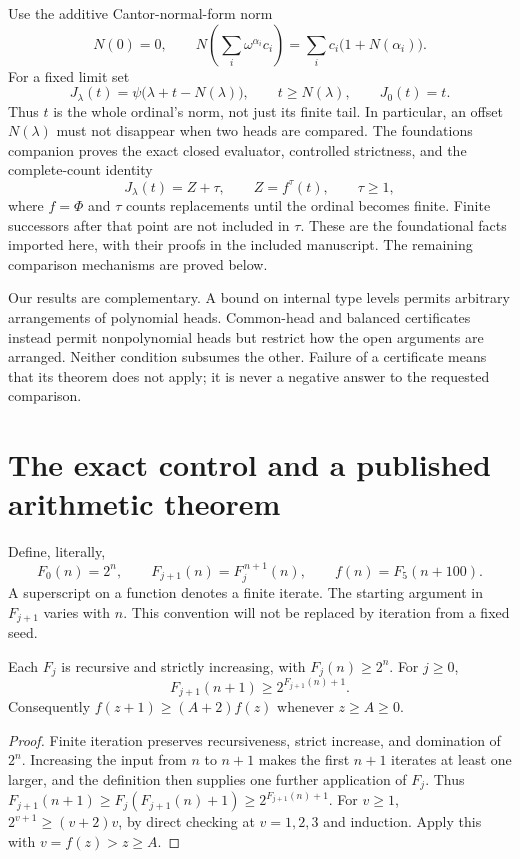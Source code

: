 \documentclass[11pt]{article}
\begin{document}
Use the additive Cantor-normal-form norm
\[
 N(0)=0,\qquad
 N\!\left(\sum_i\omega^{\alpha_i}c_i\right)
       =\sum_i c_i\bigl(1+N(\alpha_i)\bigr).
\]
For a fixed limit set
\begin{equation}\label{eq:J}
 J_\lambda(t)=\psi\bigl(\lambda+t-N(\lambda)\bigr),
       \qquad t\ge N(\lambda),\qquad J_0(t)=t.
\end{equation}
Thus $t$ is the whole ordinal's norm, not just its finite tail. In particular,
an offset $N(\lambda)$ must not disappear when two heads are compared.
The foundations companion proves the exact closed evaluator, controlled
strictness, and the complete-count identity
\begin{equation}\label{eq:complete}
 J_\lambda(t)=Z+\tau,\qquad Z=f^\tau(t),\qquad \tau\ge1,
\end{equation}
where $f=\Phi$ and $\tau$ counts replacements until the ordinal becomes
finite. Finite successors after that point are not included in $\tau$.
These are the foundational facts imported here, with their proofs in the
included manuscript. The remaining comparison mechanisms are proved below.

Our results are complementary. A bound on internal type levels permits
arbitrary arrangements of polynomial heads. Common-head and balanced
certificates instead permit nonpolynomial heads but restrict how the open
arguments are arranged. Neither condition subsumes the other. Failure of a
certificate means that its theorem does not apply; it is never a negative
answer to the requested comparison.

\section{The exact control and a published arithmetic theorem}
Define, literally,
\begin{equation}\label{eq:f}
 F_0(n)=2^n,\qquad F_{j+1}(n)=F_j^{\,n+1}(n),\qquad
 f(n)=F_5(n+100).
\end{equation}
A superscript on a function denotes a finite iterate. The starting argument
in $F_{j+1}$ varies with $n$. This convention will not be replaced by
iteration from a fixed seed.

\begin{lemma}[Growth]\label{lem:growth}
Each $F_j$ is recursive and strictly increasing, with $F_j(n)\ge2^n$.
For $j\ge0$,
\[
 F_{j+1}(n+1)\ge2^{F_{j+1}(n)+1}.
\]
Consequently $f(z+1)\ge(A+2)f(z)$ whenever $z\ge A\ge0$.
\end{lemma}
\begin{proof}
Finite iteration preserves recursiveness, strict increase, and domination
of $2^n$. Increasing the input from $n$ to $n+1$ makes the first $n+1$
iterates at least one larger, and the definition then supplies one further
application of $F_j$. Thus
$F_{j+1}(n+1)\ge F_j(F_{j+1}(n)+1)\ge2^{F_{j+1}(n)+1}$.
For $v\ge1$, $2^{v+1}\ge(v+2)v$, by direct checking at $v=1,2,3$ and
induction. Apply this with $v=f(z)>z\ge A$.
\end{proof}
\end{document}
